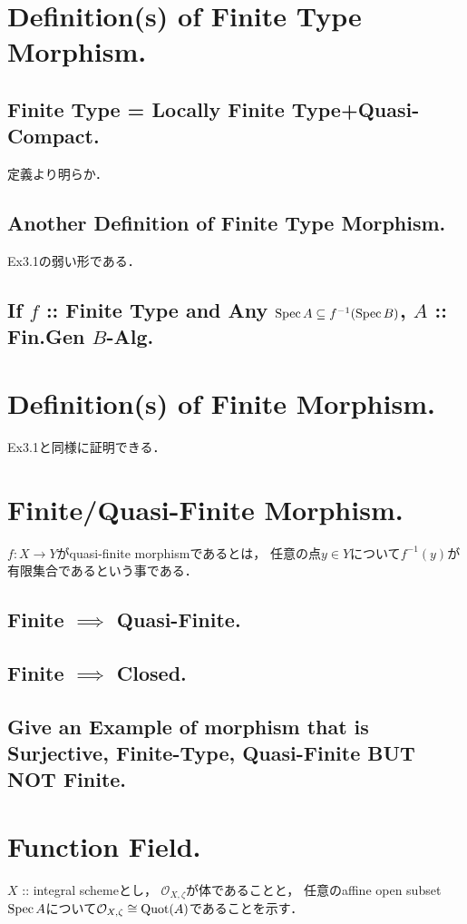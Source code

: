 \documentclass[a4paper]{jsarticle}
\newcommand{\shO}{\mathcal{O}}
\begin{document}
\section{Definition(s) of Finite Type Morphism.} %
    \subsection{Finite Type = Locally Finite Type+Quasi-Compact.}
    定義より明らか．

    \subsection{Another Definition of Finite Type Morphism.}
    Ex3.1の弱い形である．

    \subsection{If $f$ :: Finite Type and Any $\operatorname{Spec} A \subseteq f^{-1}(\operatorname{Spec} B)$, $A$ :: Fin.Gen $B$-Alg.}

\section{Definition(s) of Finite Morphism.} %
    Ex3.1と同様に証明できる．

\section{Finite/Quasi-Finite Morphism.} %
    $f: X \to Y$がquasi-finite morphismであるとは，
    任意の点$y \in Y$について$f^{-1}(y)$が有限集合であるという事である．

    \subsection{Finite $\implies$ Quasi-Finite.}
    \subsection{Finite $\implies$ Closed.}
    \subsection{Give an Example of morphism that is Surjective, Finite-Type, Quasi-Finite BUT NOT Finite.}

\section{Function Field.} %
    $X$ :: integral schemeとし，
    $\shO_{X, \zeta}$が体であることと，
    任意のaffine open subset $\operatorname{Spec} A$について$\shO_{X, \zeta} \cong \Quot(A)$であることを示す．
\end{document}
